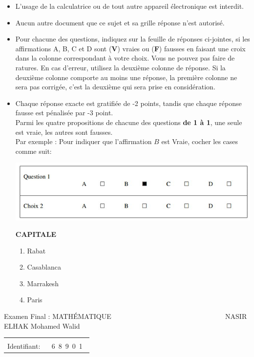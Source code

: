 \documentclass{book}%
\begin{document}
\begin{itemize}%
\item%
L'usage de la calculatrice ou de tout autre appareil électronique est interdit.%
\item%
Aucun autre document que ce sujet et sa grille réponse n'est autorisé.%
\item%
Pour chacune des questions, indiquez sur la feuille de réponses ci-jointes, si les affirmations A, B, C et D sont (\textbf{V}) vraies ou (\textbf{F}) fausses en faisant une croix dans la colonne correspondant à votre choix. Vous ne pouvez pas faire de ratures. En cas d'erreur, utilisez la deuxième colonne de réponse. Si la deuxième colonne comporte au moins une réponse, la première colonne ne sera pas corrigée, c'est la deuxième qui sera prise en considération.%
\item%
Chaque réponse exacte est gratifiée de -2 points, tandis que chaque réponse fausse est pénalisée par -3 point. \\ 	Parmi les quatre propositions de chacune des questions \textbf{de 1 à 1}, une seule est vraie, les autres sont fausses. \\ 	Par exemple : Pour indiquer que l'affirmation $B$ est Vraie, cocher les cases comme suit:  \\ \begin{center}	\includegraphics[scale=0.8]{reponses.png} \end{center}%
\thispagestyle{empty}%
\begin{exercise}%
\textbf{CAPITALE }%
\begin{enumerate}[label=\textbf{\Alph*. }]%
\item%
Rabat%
\item%
Casablanca%
\item%
Marrakesh%
\item%
Paris%
\end{enumerate}%
\end{exercise}%
\end{itemize}%
\newpage%
\thispagestyle{empty}%
Examen Final : MATHÉMATIQUE $\qquad \qquad \qquad \qquad \qquad \qquad \qquad \qquad$ NASIR ELHAK Mohamed Walid%
\begin{flushright}%
\begin{tabular}{|l|}%
\hline%
 \\%
\thispagestyle{empty}%
Identifiant: $\quad$ {\Large 6~8~9~0~1~}%
 \\%
\hline%
\end{tabular}%
\end{flushright}%
\end{document}
